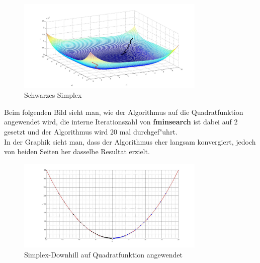 \begin{figure}[h]
	\centering
	\includegraphics[width=0.8\textwidth]{../bilder/Himmelblau3DSchwarz.jpg}%
  	\caption{Schwarzes Simplex}%
	\label{fig:HB3}%
\end{figure}
\newpage
Beim folgenden Bild sieht man, wie der Algorithmus auf die Quadratfunktion angewendet wird, die interne Iterationszahl von \textbf{fminsearch} ist dabei auf 2 gesetzt und der Algorithmus wird 20 mal durchgef"uhrt.\\
In der Graphik sieht man, dass der Algorithmus eher langsam konvergiert, jedoch von beiden Seiten her dasselbe Resultat erzielt. 
\begin{figure}[h]
	\centering
	\includegraphics[width=0.8\textwidth]{../bilder/Quadrat.jpg}%
  	\caption{Simplex-Downhill auf Quadratfunktion angewendet}%
	\label{fig:SQ1}%
\end{figure}